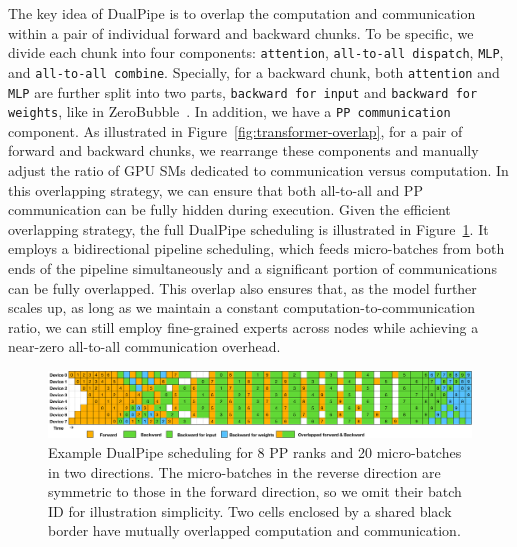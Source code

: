 \documentclass[11pt, a4paper, logo, copyright, nonumbering]{deepseek}
\begin{document}
\begin{CJK*}{UTF8}{gbsn}
The key idea of DualPipe is to overlap the computation and communication within a pair of individual forward and backward chunks.
To be specific, we divide each chunk into four components: \texttt{attention}, \texttt{all-to-all dispatch}, \texttt{MLP}, and \texttt{all-to-all combine}. 
Specially, for a backward chunk, both \texttt{attention} and \texttt{MLP} are further split into two parts, \texttt{backward for input} and \texttt{backward for weights}, like in ZeroBubble~\citep{zerobubble}. 
In addition, we have a \texttt{PP communication} component. 
As illustrated in Figure~\ref{fig:transformer-overlap}, for a pair of forward and backward chunks, we rearrange these components and manually adjust the ratio of GPU SMs dedicated to communication versus computation. 
In this overlapping strategy, we can ensure that both all-to-all and PP communication can be fully hidden during execution. 
Given the efficient overlapping strategy, the full DualPipe scheduling is illustrated in Figure~\ref{fig:dualpipe-schedules}. 
It employs a bidirectional pipeline scheduling, which feeds micro-batches from both ends of the pipeline simultaneously and a significant portion of communications can be fully overlapped.
This overlap also ensures that, as the model further scales up, as long as we maintain a constant computation-to-communication ratio, we can still employ fine-grained experts across nodes while achieving a near-zero all-to-all communication overhead.

\begin{figure}[t]
    \centering
    \includegraphics[width=0.99\linewidth]{figures/dualpipe.pdf}
    \caption{
        Example DualPipe scheduling for 8 PP ranks and 20 micro-batches in two directions. 
        The micro-batches in the reverse direction are symmetric to those in the forward direction, so we omit their batch ID for illustration simplicity. 
        Two cells enclosed by a shared black border have mutually overlapped computation and communication. 
    }
    \label{fig:dualpipe-schedules}
\end{figure}


\end{CJK*}
\end{document}
